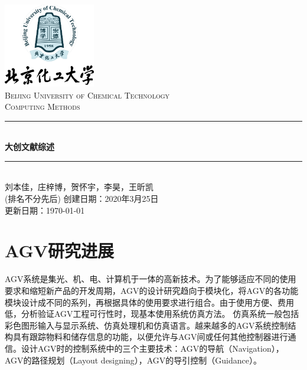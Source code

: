 \documentclass[cs4size,a4paper]{ctexart}
\numberwithin{equation}{section}
\numberwithin{table}{section}
\numberwithin{figure}{section}
\newcommand{\HRule}{\rule{\linewidth}{0.5mm}}
\begin{document}
\newtheorem{example}{例}              	%
\newtheorem{algorithem}{算法}	
\newtheorem{theorem}{定理}            	%
\newtheorem{definition}{定义}
\newtheorem{axiom}{公理}
\newtheorem{property}{性质}
\newtheorem{proposition}{命题}
\newtheorem{lemma}{引理}
\newtheorem{corollary}{推论}
\newtheorem{remark}{注解}
\newtheorem{condition}{条件}
\newtheorem{conclusion}{结论}
\newtheorem{assumption}{假设}
\renewcommand{\contentsname}{目录}     
\renewcommand{\abstractname}{摘要} 
\renewcommand{\refname}{参考文献}     
\renewcommand{\indexname}{索引}
\renewcommand{\figurename}{图}
\renewcommand{\tablename}{表}
\renewcommand{\appendixname}{附录}
\renewcommand{\proofname}{证明}
\renewcommand\emph[1]{\textcolor{black}{\textbf{#1}}}
\begin{titlepage}
\begin{center}
\includegraphics[width=0.30\textwidth]{logo}\\[1cm]    
\textsc{\Large Beijing University of Chemical Technology}\\[1.0cm]
\textsc{\Large Computing Methods}\\[0.5cm]
\HRule \\[0.8cm]
{\huge \bfseries 大创文献综述}\\[0.4cm]
\HRule \\[0.7cm]
\textsc{刘本佳，庄梓博，贺怀宇，李昊，王昕凯\\(排名不分先后)}
\tableofcontents 
\vfill
{创建日期：2020年3月25日}\\
{更新日期：\today}
\end{center}
\end{titlepage}
\pagestyle{plain}
\thispagestyle{empty}
\pagestyle{fancy}

\section{AGV研究进展}
AGV系统是集光、机、电、计算机于一体的高新技术。为了能够适应不同的使用要求和缩短新产品的开发周期，AGV的设计研究趋向于模块化，将AGV的各功能模块设计成不同的系列，再根据具体的使用要求进行组合。由于使用方便、费用低，分析验证AGV工程可行性时，现基本使用系统仿真方法。
仿真系统一般包括彩色图形输入与显示系统、仿真处理机和仿真语言。越来越多的AGV系统控制结构具有跟踪物料和储存信息的功能，以便允许与AGV间或任何其他控制器进行通信。设计AGV时的控制系统中的三个主要技术：AGV的导航（Navigation），AGV的路径规划（Layout designing），AGV的导引控制（Guidance）。
\end{document}
